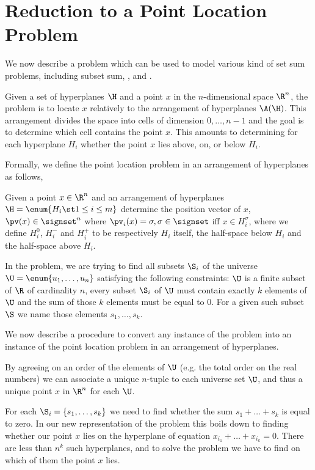 \section{Reduction to a Point Location Problem}

We now describe a problem which can be used to model
various kind of set sum problems, including subset sum, \kSUM, and \kLDT.

Given a set of hyperplanes \(\H\) and a point \(x\) in the \(n\)-dimensional
space \(\R^n\), the problem is to locate \(x\) relatively
to the arrangement of hyperplanes \(\A(\H)\). This arrangement divides the space
into cells of dimension \(0,\ldots,n-1\) and the goal is to determine which
cell contains the point \(x\). This amounts to determining for each
hyperplane \(H_i\) whether the point \(x\) lies above, on, or below \(H_i\).

Formally, we define the point location problem in an arrangement of hyperplanes as
follows,

\begin{problem}
Given a point $x \in \R^n$ and an arrangement of hyperplanes $\H = \enum{ H_i
\st 1 \leq i \leq m }$ determine the position vector of $x$, $\pv(x) \in
\signset^n$ where $\pv_i(x) = \sigma, \sigma \in \signset$ iff $x \in
H_i^{\sigma}$, where we define $H_i^{0}$, $H_i^{-}$ and $H_i^{+}$ to be
respectively $H_i$ itself, the half-space below $H_i$ and the half-space above
$H_i$.
\end{problem}

In the \kSUM problem, we are trying to find all subsets \(\S_i\) of the
universe \(\U = \enum{u_1,\ldots,u_n}\) satisfying the following constraints:
\(\U\) is a finite subset of \(\R\) of cardinality \(n\), every subset $\S_i$
of $\U$ must contain exactly $k$ elements of $\U$ and the sum of those $k$
elements must be equal to $0$. For a given such subset $\S$ we name those elements
$s_1, \dots, s_k$.

We now describe a procedure to convert any instance of the \kSUM problem into an
instance of the point location problem in an arrangement of hyperplanes.

By agreeing on an order of the elements of $\U$ (e.g. the total order on
the real numbers) we can associate a unique $n$-tuple to each universe set $\U$,
and thus a unique point $x$ in $\R^n$ for each $\U$.

For each $\S_i = \left\{s_1, \dots, s_k\right\}$ we need to find whether the sum $s_1
+ \dots + s_k$ is equal to zero. In our new representation of the problem this
boils down to finding whether our point $x$ lies on the hyperplane of
equation $x_{i_1} + \dots + x_{i_k} = 0$. There are less than $n^k$ such
hyperplanes, and to solve the problem
we have to find on which of them the point $x$ lies.

